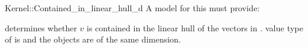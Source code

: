 \begin{ccRefFunctionObjectConcept}{Kernel::Contained_in_linear_hull_d}
A model for this must provide:


{determines whether $v$ is contained in the linear hull
of the vectors in \ccc{A = tuple [first,last)}.
\ccPrecond value type of  is 
and the objects are of the same dimension.}

\end{ccRefFunctionObjectConcept}
